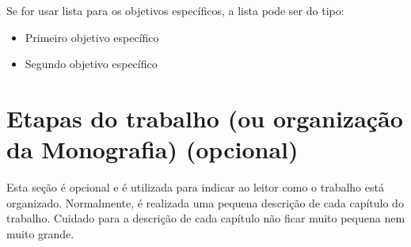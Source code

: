 Se for usar lista para os objetivos específicos, a lista pode ser do tipo:
\begin{itemize}
    \item Primeiro objetivo específico
    \item Segundo objetivo específico
\end{itemize}

\section{Etapas do trabalho (ou organização da Monografia) (opcional)}

Esta seção é opcional e é utilizada para indicar ao leitor como o trabalho está organizado.
Normalmente, é realizada uma pequena descrição de cada capítulo do trabalho.
Cuidado para a descrição de cada capítulo não ficar muito pequena nem muito grande.
